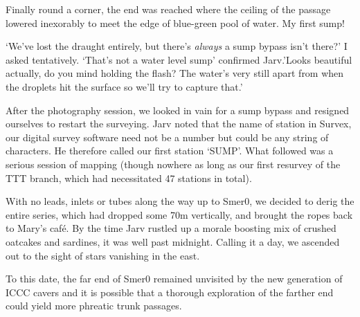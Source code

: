 Finally round a corner, the end was reached where the ceiling of the passage lowered inexorably to meet the edge of blue-green pool of water. My first sump!

‘We’ve lost the draught entirely, but there’s \emph{always} a sump bypass isn’t there?’ I asked tentatively.
‘That’s not a water level sump’ confirmed Jarv.’Looks beautiful actually, do you mind holding the flash? The water’s very still apart from when the droplets hit the surface so we’ll try to capture that.’

After the photography session, we looked in vain for a sump bypass and resigned ourselves to restart the surveying. Jarv noted that the name of station in Survex, our digital survey software need not be a number but could be any string of characters. He therefore called our first station ‘SUMP’. What followed was a serious session of mapping (though nowhere as long as our first resurvey of the TTT branch, which had necessitated 47 stations in total). 

With no leads, inlets or tubes along the way up to Smer0, we decided to derig the entire series, which had dropped some 70m vertically, and brought the ropes back to Mary’s café. By the time Jarv rustled up a morale boosting mix of crushed oatcakes and sardines, it was well past midnight. Calling it a day, we ascended out to the sight of stars vanishing in the east. 

To this date, the far end of Smer0 remained unvisited by the new generation of ICCC cavers and it is possible that a thorough exploration of the farther end could yield more phreatic trunk passages.

